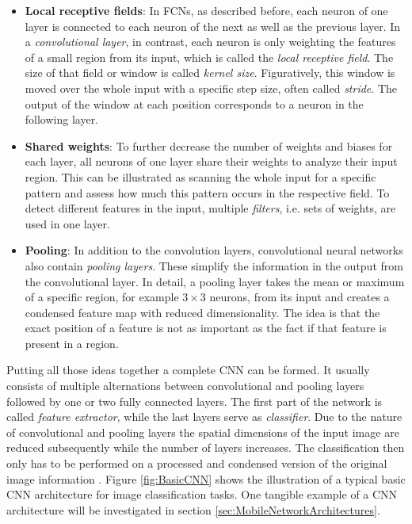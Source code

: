 \begin{itemize}
\item \textbf{Local receptive fields}: In FCNs, as described before, each neuron of one layer is connected to each neuron of the next as well as the previous layer. In a \textit{convolutional layer}, in contrast, each neuron is only weighting the features of a small region from its input, which is called the \textit{local receptive field}. The size of that field or window is called \textit{kernel size}. Figuratively, this window is moved over the whole input with a specific step size, often called \textit{stride}. The output of the window at each position corresponds to a neuron in the following layer. 
\item \textbf{Shared weights}: To further decrease the number of weights and biases for each layer, all neurons of one layer share their weights to analyze their input region. This can be illustrated as scanning the whole input for a specific pattern and assess how much this pattern occurs in the respective field. To detect different features in the input, multiple \textit{filters}, i.e. sets of weights, are used in one layer.  
\item \textbf{Pooling}: In addition to the convolution layers, convolutional neural networks also contain \textit{pooling layers}. These simplify the information in the output from the convolutional layer. In detail, a pooling layer takes the mean or maximum of a specific region, for example $3\times 3$ neurons, from its input and creates a condensed feature map with reduced dimensionality. The idea is that the exact position of a feature is not as important as the fact if that feature is present in a region. 
\end{itemize}
Putting all those ideas together a complete CNN can be formed. It usually consists of multiple alternations between convolutional and pooling layers followed by one or two fully connected layers. The first part of the network is called \textit{feature extractor}, while the last layers serve as \textit{classifier}. Due to the nature of convolutional and pooling layers the spatial dimensions of the input image are reduced subsequently while the number of layers increases. The classification then only has to be performed on a processed and condensed version of the original image information \cite{nielsenneural}. Figure \ref{fig:BasicCNN} shows the illustration of a typical basic CNN architecture for image classification tasks. One tangible example of a CNN architecture will be investigated in section \ref{sec:MobileNetworkArchitectures}.\\
